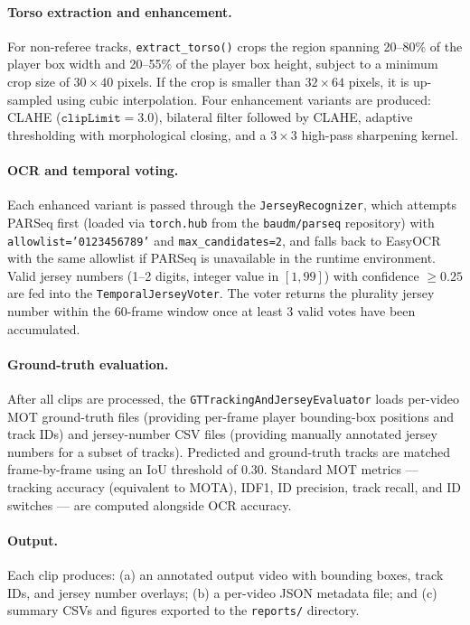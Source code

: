 \paragraph{Torso extraction and enhancement.} For non-referee tracks,
\texttt{extract\-\_torso()} crops the region spanning 20--80\% of the
player box width and 20--55\% of the player box height, subject to a
minimum crop size of $30 \times 40$ pixels. If the crop is smaller than
$32 \times 64$ pixels, it is up-sampled using cubic interpolation. Four
enhancement variants are produced: CLAHE ($\texttt{clipLimit}=3.0$),
bilateral filter followed by CLAHE, adaptive thresholding with
morphological closing, and a $3\times3$ high-pass sharpening kernel.

\paragraph{OCR and temporal voting.} Each enhanced variant is passed
through the \texttt{JerseyRecognizer}, which attempts PARSeq first
(loaded via \texttt{torch.hub} from the \texttt{baudm/parseq}
repository) with \texttt{allowlist='0123456789'} and
\texttt{max\_candidates=2}, and falls back to EasyOCR with the same
allowlist if PARSeq is unavailable in the runtime environment. Valid
jersey numbers (1--2 digits, integer value in $[1, 99]$) with
confidence $\geq 0.25$ are fed into the \texttt{Temporal\-Jersey\-Voter}.
The voter returns the plurality jersey number within the 60-frame
window once at least 3 valid votes have been accumulated.

\paragraph{Ground-truth evaluation.} After all clips are processed,
the \texttt{GT\-Tracking\-And\-Jersey\-Evaluator} loads per-video MOT
ground-truth files (providing per-frame player bounding-box positions
and track IDs) and jersey-number CSV files (providing manually annotated
jersey numbers for a subset of tracks). Predicted and ground-truth
tracks are matched frame-by-frame using an IoU threshold of 0.30.
Standard MOT metrics --- tracking accuracy (equivalent to MOTA), IDF1,
ID precision, track recall, and ID switches --- are computed alongside
OCR accuracy.

\paragraph{Output.} Each clip produces: (a) an annotated output video
with bounding boxes, track IDs, and jersey number overlays; (b) a
per-video JSON metadata file; and (c) summary CSVs and figures exported
to the \texttt{reports/} directory.

